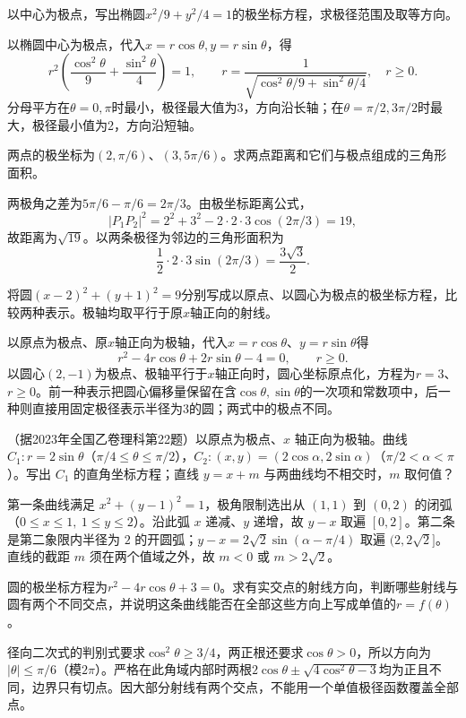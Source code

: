 以中心为极点，写出椭圆\(x^2/9+y^2/4=1\)的极坐标方程，求极径范围及取等方向。
\par
\solutionanswer
以椭圆中心为极点，代入\(x=r\cos\theta,y=r\sin\theta\)，得
\[r^2\left(\frac{\cos^2\theta}{9}+\frac{\sin^2\theta}{4}\right)=1,\qquad r=\frac{1}{\sqrt{\cos^2\theta/9+\sin^2\theta/4}},\quad r\ge0.\]
分母平方在\(\theta=0,\pi\)时最小，极径最大值为3，方向沿长轴；在\(\theta=\pi/2,3\pi/2\)时最大，极径最小值为2，方向沿短轴。


两点的极坐标为\((2,\pi/6)\)、\((3,5\pi/6)\)。求两点距离和它们与极点组成的三角形面积。
\par
\solutionanswer
两极角之差为\(5\pi/6-\pi/6=2\pi/3\)。由极坐标距离公式，
\[
|P_1P_2|^2=2^2+3^2-2\cdot2\cdot3\cos(2\pi/3)=19,
\]
故距离为\(\sqrt{19}\)。以两条极径为邻边的三角形面积为
\[
\frac12\cdot2\cdot3\sin(2\pi/3)=\frac{3\sqrt3}{2}.
\]


将圆\((x-2)^2+(y+1)^2=9\)分别写成以原点、以圆心为极点的极坐标方程，比较两种表示。极轴均取平行于原\(x\)轴正向的射线。
\par
\solutionanswer
以原点为极点、原\(x\)轴正向为极轴，代入\(x=r\cos\theta\)、\(y=r\sin\theta\)得
\[
r^2-4r\cos\theta+2r\sin\theta-4=0,\qquad r\ge0.
\]
以圆心\((2,-1)\)为极点、极轴平行于\(x\)轴正向时，圆心坐标原点化，方程为\(r=3\)、\(r\ge0\)。前一种表示把圆心偏移量保留在含\(\cos\theta,\sin\theta\)的一次项和常数项中，后一种则直接用固定极径表示半径为\(3\)的圆；两式中的极点不同。


（据2023年全国乙卷理科第22题）以原点为极点、\(x\) 轴正向为极轴。曲线 \(C_1:r=2\sin\theta\)（\(\pi/4\le\theta\le\pi/2\)），\(C_2:(x,y)=(2\cos\alpha,2\sin\alpha)\)（\(\pi/2<\alpha<\pi\)）。写出 \(C_1\) 的直角坐标方程；直线 \(y=x+m\) 与两曲线均不相交时，\(m\) 取何值？
\par
\solutionanswer
第一条曲线满足 \(x^2+(y-1)^2=1\)，极角限制选出从 \((1,1)\) 到 \((0,2)\) 的闭弧（\(0\le x\le1,\ 1\le y\le2\)）。沿此弧 \(x\) 递减、\(y\) 递增，故 \(y-x\) 取遍 \([0,2]\)。第二条是第二象限内半径为 \(2\) 的开圆弧；\(y-x=2\sqrt2\sin(\alpha-\pi/4)\) 取遍 \((2,2\sqrt2]\)。直线的截距 \(m\) 须在两个值域之外，故 \(m<0\) 或 \(m>2\sqrt2\)。


圆的极坐标方程为\(r^2-4r\cos\theta+3=0\)。求有实交点的射线方向，判断哪些射线与圆有两个不同交点，并说明这条曲线能否在全部这些方向上写成单值的\(r=f(\theta)\)。
\par
\solutionanswer
径向二次式的判别式要求\(\cos^2\theta\ge3/4\)，两正根还要求\(\cos\theta>0\)，所以方向为\(|\theta|\le\pi/6\)（模\(2\pi\)）。严格在此角域内部时两根\(2\cos\theta\pm\sqrt{4\cos^2\theta-3}\)均为正且不同，边界只有切点。因大部分射线有两个交点，不能用一个单值极径函数覆盖全部点。


